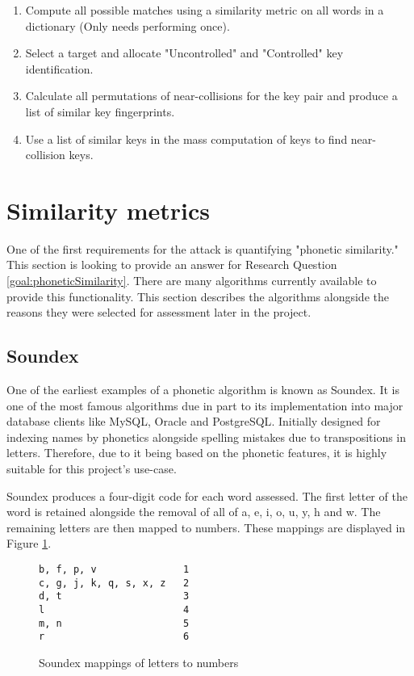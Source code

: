 \begin{enumerate}
    \item Compute all possible matches using a similarity metric on all words in a dictionary (Only needs performing once).

    \item Select a target and allocate "Uncontrolled" and "Controlled" key identification.
    
    \item Calculate all permutations of near-collisions for the key pair and produce a list of similar key fingerprints.
    
    \item Use a list of similar keys in the mass computation of keys to find near-collision keys.

\end{enumerate}

\section{Similarity metrics}
\label{sec:metrics}
One of the first requirements for the attack is quantifying "phonetic similarity." This section is looking to provide an answer for Research Question \ref{goal:phoneticSimilarity}. There are many algorithms currently available to provide this functionality. This section describes the algorithms alongside the reasons they were selected for assessment later in the project.

\subsection{Soundex}
One of the earliest examples of a phonetic algorithm is known as Soundex. It is one of the most famous algorithms due in part to its implementation into major database clients like MySQL\cite{mysql_soundex}, Oracle\cite{moved_2005} and PostgreSQL\cite{postgresql}. Initially designed for indexing names by phonetics alongside spelling mistakes due to transpositions in letters. Therefore, due to it being based on the phonetic features, it is highly suitable for this project's use-case. 

Soundex produces a four-digit code for each word assessed.
The first letter of the word is retained alongside the removal of all of a, e, i, o, u, y, h and w. The remaining letters are then mapped to numbers. These mappings are displayed in Figure \ref{fig:soundexMap}.

\begin{figure}[h!]
    \centering
    \begin{BVerbatim}
b, f, p, v               1
c, g, j, k, q, s, x, z   2
d, t                     3
l                        4
m, n                     5
r                        6
    \end{BVerbatim}

    \caption{Soundex mappings of letters to numbers}
    \label{fig:soundexMap}
\end{figure}


